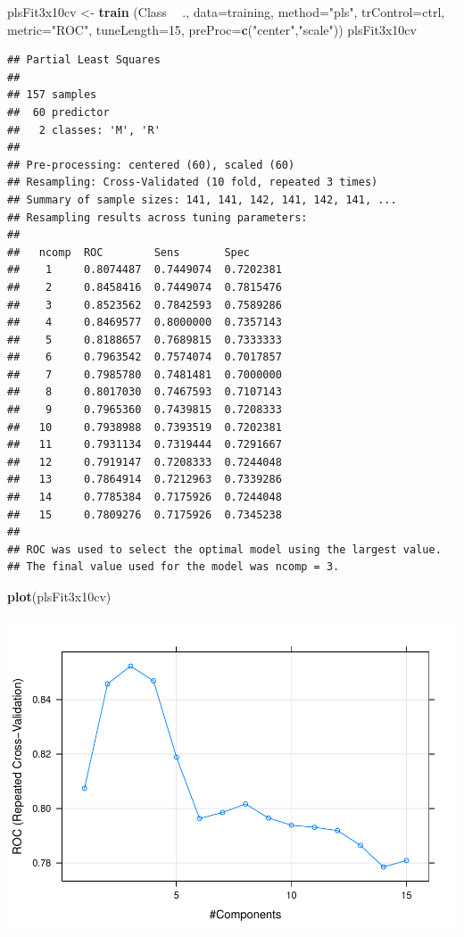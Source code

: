 \documentclass[
]{article}
\newenvironment{Shaded}{\begin{snugshade}}{\end{snugshade}}
\newcommand{\DataTypeTok}[1]{\textcolor[rgb]{0.13,0.29,0.53}{#1}}
\newcommand{\DecValTok}[1]{\textcolor[rgb]{0.00,0.00,0.81}{#1}}
\newcommand{\KeywordTok}[1]{\textcolor[rgb]{0.13,0.29,0.53}{\textbf{#1}}}
\newcommand{\NormalTok}[1]{#1}
\newcommand{\OperatorTok}[1]{\textcolor[rgb]{0.81,0.36,0.00}{\textbf{#1}}}
\newcommand{\StringTok}[1]{\textcolor[rgb]{0.31,0.60,0.02}{#1}}
\begin{document}
\begin{Shaded}
\begin{Highlighting}[]
\NormalTok{plsFit3x10cv <-}\StringTok{ }\KeywordTok{train}\NormalTok{ (Class }\OperatorTok{~}\StringTok{ }\NormalTok{., }\DataTypeTok{data=}\NormalTok{training, }\DataTypeTok{method=}\StringTok{"pls"}\NormalTok{, }\DataTypeTok{trControl=}\NormalTok{ctrl, }
                       \DataTypeTok{metric=}\StringTok{"ROC"}\NormalTok{, }
                       \DataTypeTok{tuneLength=}\DecValTok{15}\NormalTok{, }
                       \DataTypeTok{preProc=}\KeywordTok{c}\NormalTok{(}\StringTok{"center"}\NormalTok{,}\StringTok{"scale"}\NormalTok{))}
\NormalTok{plsFit3x10cv}
\end{Highlighting}
\end{Shaded}

\begin{verbatim}
## Partial Least Squares 
## 
## 157 samples
##  60 predictor
##   2 classes: 'M', 'R' 
## 
## Pre-processing: centered (60), scaled (60) 
## Resampling: Cross-Validated (10 fold, repeated 3 times) 
## Summary of sample sizes: 141, 141, 142, 141, 142, 141, ... 
## Resampling results across tuning parameters:
## 
##   ncomp  ROC        Sens       Spec     
##    1     0.8074487  0.7449074  0.7202381
##    2     0.8458416  0.7449074  0.7815476
##    3     0.8523562  0.7842593  0.7589286
##    4     0.8469577  0.8000000  0.7357143
##    5     0.8188657  0.7689815  0.7333333
##    6     0.7963542  0.7574074  0.7017857
##    7     0.7985780  0.7481481  0.7000000
##    8     0.8017030  0.7467593  0.7107143
##    9     0.7965360  0.7439815  0.7208333
##   10     0.7938988  0.7393519  0.7202381
##   11     0.7931134  0.7319444  0.7291667
##   12     0.7919147  0.7208333  0.7244048
##   13     0.7864914  0.7212963  0.7339286
##   14     0.7785384  0.7175926  0.7244048
##   15     0.7809276  0.7175926  0.7345238
## 
## ROC was used to select the optimal model using the largest value.
## The final value used for the model was ncomp = 3.
\end{verbatim}

\begin{Shaded}
\begin{Highlighting}[]
\KeywordTok{plot}\NormalTok{(plsFit3x10cv)}
\end{Highlighting}
\end{Shaded}

\begin{center}\includegraphics[width=0.7\linewidth]{tutorial_files/figure-latex/unnamed-chunk-11-2} \end{center}
\end{document}
